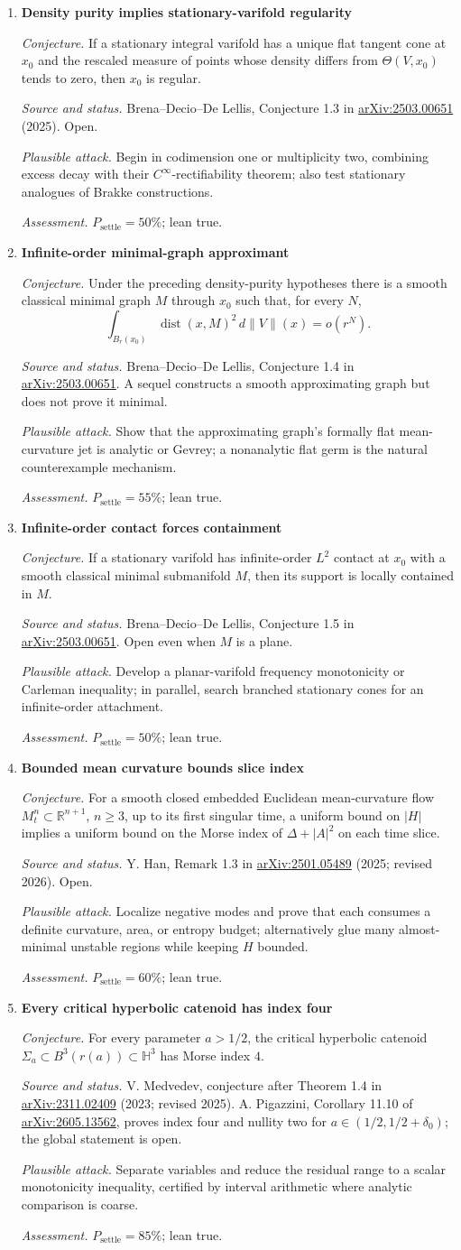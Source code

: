 \documentclass[11pt]{article}
\newcommand{\cand}[5]{%
  \item \textbf{#1}\par
  \emph{Conjecture.} #2\par
  \emph{Source and status.} #3\par
  \emph{Plausible attack.} #4\par
  \emph{Assessment.} #5
}
\newcommand{\psettle}{P_{\mathrm{settle}}}
\begin{document}
\begin{enumerate}[label=\textbf{L\arabic*.}]
\cand{Density purity implies stationary-varifold regularity}
{If a stationary integral varifold has a unique flat tangent cone at $x_0$ and the rescaled measure of points whose density differs from $\Theta(V,x_0)$ tends to zero, then $x_0$ is regular.}
{Brena--Decio--De Lellis, Conjecture 1.3 in \href{https://arxiv.org/abs/2503.00651}{arXiv:2503.00651} (2025).  Open.}
{Begin in codimension one or multiplicity two, combining excess decay with their $C^\infty$-rectifiability theorem; also test stationary analogues of Brakke constructions.}
{$\psettle=50\%$; lean true.}

\cand{Infinite-order minimal-graph approximant}
{Under the preceding density-purity hypotheses there is a smooth classical minimal graph $M$ through $x_0$ such that, for every $N$,
\[\int_{B_r(x_0)}\operatorname{dist}(x,M)^2\,d\|V\|(x)=o(r^N).\]}
{Brena--Decio--De Lellis, Conjecture 1.4 in \href{https://arxiv.org/abs/2503.00651}{arXiv:2503.00651}.  A sequel constructs a smooth approximating graph but does not prove it minimal.}
{Show that the approximating graph's formally flat mean-curvature jet is analytic or Gevrey; a nonanalytic flat germ is the natural counterexample mechanism.}
{$\psettle=55\%$; lean true.}

\cand{Infinite-order contact forces containment}
{If a stationary varifold has infinite-order $L^2$ contact at $x_0$ with a smooth classical minimal submanifold $M$, then its support is locally contained in $M$.}
{Brena--Decio--De Lellis, Conjecture 1.5 in \href{https://arxiv.org/abs/2503.00651}{arXiv:2503.00651}.  Open even when $M$ is a plane.}
{Develop a planar-varifold frequency monotonicity or Carleman inequality; in parallel, search branched stationary cones for an infinite-order attachment.}
{$\psettle=50\%$; lean true.}

\cand{Bounded mean curvature bounds slice index}
{For a smooth closed embedded Euclidean mean-curvature flow $M_t^n\subset\mathbb R^{n+1}$, $n\ge3$, up to its first singular time, a uniform bound on $|H|$ implies a uniform bound on the Morse index of $\Delta+|A|^2$ on each time slice.}
{Y. Han, Remark 1.3 in \href{https://arxiv.org/abs/2501.05489}{arXiv:2501.05489} (2025; revised 2026).  Open.}
{Localize negative modes and prove that each consumes a definite curvature, area, or entropy budget; alternatively glue many almost-minimal unstable regions while keeping $H$ bounded.}
{$\psettle=60\%$; lean true.}

\cand{Every critical hyperbolic catenoid has index four}
{For every parameter $a>1/2$, the critical hyperbolic catenoid $\Sigma_a\subset B^3(r(a))\subset\mathbb H^3$ has Morse index $4$.}
{V. Medvedev, conjecture after Theorem 1.4 in \href{https://arxiv.org/abs/2311.02409}{arXiv:2311.02409} (2023; revised 2025).  A. Pigazzini, Corollary 11.10 of \href{https://arxiv.org/abs/2605.13562}{arXiv:2605.13562}, proves index four and nullity two for $a\in(1/2,1/2+\delta_0)$; the global statement is open.}
{Separate variables and reduce the residual range to a scalar monotonicity inequality, certified by interval arithmetic where analytic comparison is coarse.}
{$\psettle=85\%$; lean true.}


\end{enumerate}
\end{document}

